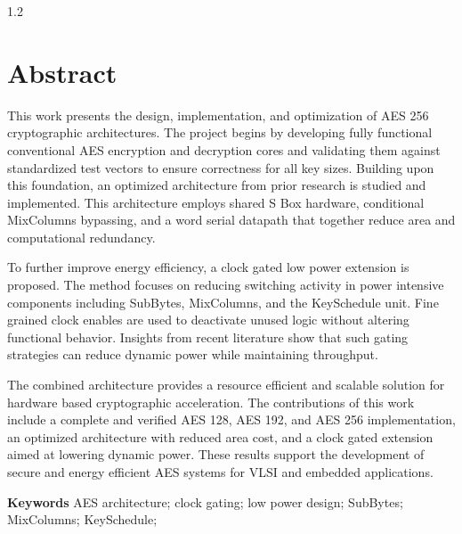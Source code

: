 \documentclass[12pt,a4paper]{report}
\begin{document}
\begin{center}
\begin{minipage}{0.92\textwidth}
\begin{spacing}{1.2}
{\large
\section*{Abstract}

This work presents the design, implementation, and optimization of AES 256 cryptographic architectures. The project begins by developing fully functional conventional AES encryption and decryption cores and validating them against standardized test vectors to ensure correctness for all key sizes. Building upon this foundation, an optimized architecture from prior research is studied and implemented. This architecture employs shared S Box hardware, conditional MixColumns bypassing, and a word serial datapath that together reduce area and computational redundancy.

To further improve energy efficiency, a clock gated low power extension is proposed. The method focuses on reducing switching activity in power intensive components including SubBytes, MixColumns, and the KeySchedule unit. Fine grained clock enables are used to deactivate unused logic without altering functional behavior. Insights from recent literature show that such gating strategies can reduce dynamic power while maintaining throughput.

The combined architecture provides a resource efficient and scalable solution for hardware based cryptographic acceleration. The contributions of this work include a complete and verified AES 128, AES 192, and AES 256 implementation, an optimized architecture with reduced area cost, and a clock gated extension aimed at lowering dynamic power. These results support the development of secure and energy efficient AES systems for VLSI and embedded applications.

}
\end{spacing}
\end{minipage}
\end{center}

\vspace{0.8cm}
\noindent\textbf{Keywords} AES architecture; clock gating; low power design; SubBytes; MixColumns; KeySchedule;

\end{document}
